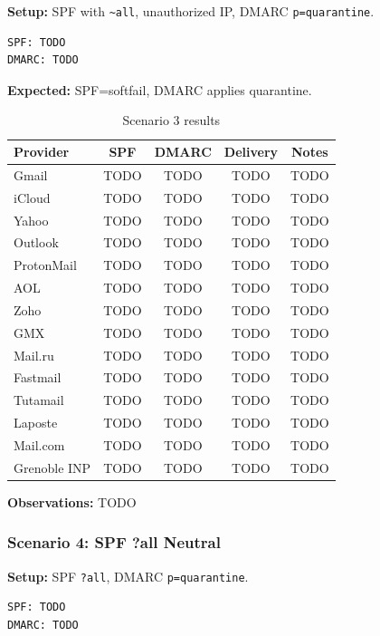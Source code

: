 \documentclass[11pt,a4paper]{article}
\begin{document}
\textbf{Setup:} SPF with \texttt{\textasciitilde all}, unauthorized IP, DMARC \texttt{p=quarantine}.

\begin{lstlisting}
SPF: TODO
DMARC: TODO
\end{lstlisting}

\textbf{Expected:} SPF=softfail, DMARC applies quarantine.

\begin{table}[h]
\centering
\small
\begin{tabular}{lcccc}
\toprule
\textbf{Provider} & \textbf{SPF} & \textbf{DMARC} & \textbf{Delivery} & \textbf{Notes} \\
\midrule
Gmail & TODO & TODO & TODO & TODO \\
iCloud & TODO & TODO & TODO & TODO \\
Yahoo & TODO & TODO & TODO & TODO \\
Outlook & TODO & TODO & TODO & TODO \\
ProtonMail & TODO & TODO & TODO & TODO \\
AOL & TODO & TODO & TODO & TODO \\
Zoho & TODO & TODO & TODO & TODO \\
GMX & TODO & TODO & TODO & TODO \\
Mail.ru & TODO & TODO & TODO & TODO \\
Fastmail & TODO & TODO & TODO & TODO \\
Tutamail & TODO & TODO & TODO & TODO \\
Laposte & TODO & TODO & TODO & TODO \\
Mail.com & TODO & TODO & TODO & TODO \\
Grenoble INP & TODO & TODO & TODO & TODO \\
\bottomrule
\end{tabular}
\caption{Scenario 3 results}
\end{table}

\textbf{Observations:} TODO


\subsubsection{Scenario 4: SPF ?all Neutral}

\textbf{Setup:} SPF \texttt{?all}, DMARC \texttt{p=quarantine}.

\begin{lstlisting}
SPF: TODO
DMARC: TODO
\end{lstlisting}
\end{document}
